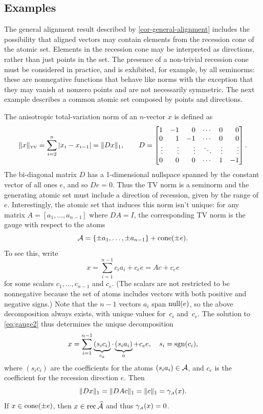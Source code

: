 \subsection{Examples}
The general alignment result described by \autoref{cor-general-alignment} includes
the possibility that aligned vectors may contain elements from the recession
cone of the atomic set. Elements in the recession cone may be interpreted as
directions, rather than just points in the set. The presence of a non-trivial
recession cone must be considered in practice, and is exhibited, for example, by
all seminorms: these are nonnegative functions that behave like norms with the
exception that they may vanish at nonzero points and are not necessarily
symmetric. The next example describes a common atomic set composed by
points and directions.

\begin{example}
  The anisotropic total-variation norm of an $n$-vector $x$ is defined as
\[
  \|x\|_{\scriptscriptstyle\rm TV}
  = \sum_{i=2}^n |x_i-x_{i-1}| = \|Dx\|_1,\qquad
  D = \begin{bmatrix*}[r]
    1 & -1 & 0 & \cdots & 0& 0 \\
    0 &1 & -1 &  \cdots & 0 & 0\\
    \vdots &\vdots & \vdots & \ddots & \vdots  & \vdots\\
    0 & 0 & 0 & \cdots & 1 & -1
    \end{bmatrix*}.
\]
The bi-diagonal matrix $D$ has a 1-dimensional nullspace spanned by the constant
vector of all ones $e$, and so $De=0$. Thus the TV norm is a seminorm and the
generating atomic set must include a direction of recession, given by the range
of $e$. Interestingly, the atomic set that induces this norm isn't unique: for
any matrix $A=[a_1,\ldots,a_{n-1}]$ where $DA = I$, the corresponding TV norm is
the gauge with respect to the atoms
\begin{equation*}
\mathcal{A} = \{\pm a_1,\ldots,\pm a_{n-1} \} + \operatorname{cone} (\pm e).
\end{equation*}
To see this, write
\[
  x = \sum_{i=1}^{n-1} c_i a_i + c_e e = A c + c_e e
\]
for some scalars $c_1,\ldots,c_{n-1}$ and $c_e$. (The scalars are not
restricted to be nonnegative because the set of atoms includes vectors
with both positive and negative signs.)  Note that the $n-1$ vectors
$a_i$ span $\operatorname{null}(e)$, so the above decomposition always exists, with
unique values for~$c_i$ and~$c_e$. The solution to \eqref{eq:gauge2} thus
determines the unique decomposition
\[
  x = \sum_{i=1}^{n-1} \underbrace{(s_ic_i)}_{c_a}\cdot\underbrace{(s_ia_i)}_{a} + c_e e,
  \quad s_i = \operatorname{sgn}(c_i),
\]
where $(s_ic_i)$ are the coefficients for the atoms
$(s_ia_i)\in\mathcal{A}$, and $c_e$ is the coefficient for the recession
direction $e$.  Then
\[
\|Dx\|_1 = \|DAc\|_1 = \|c\|_1 = 
\gamma_{\scriptscriptstyle\mathcal{A}}(x).
\]
If $x\in\operatorname{cone}(\pm e)$, then $x\in\operatorname{rec}\widehat{\mathcal{A}}$ and thus $\gamma_{\scriptscriptstyle\mathcal{A}}(x)=0$.


\end{example}
